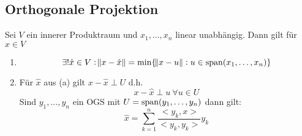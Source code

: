 \subsection{Orthogonale Projektion}
Sei $V$ ein innerer Produktraum und $x_1, \ldots, x_n$ linear unabhängig. Dann gilt
für $x \in V$
\begin{enumerate}[label= (\alph*)]
	\item
		\begin{equation*}
			\exists! \hat{x} \in V: \norm{x - \hat{x}} = 
			\min \{\norm{x-u}: u \in \operatorname{span}(x_1, \ldots, x_n) \}
		\end{equation*}
	\item
		Für $\hat{x}$ aus (a) gilt $x-\hat{x} \perp U$ d.h.
		\begin{equation*}
			x - \hat{x} \perp u\ \forall u \in U
		\end{equation*}
		Sind $y_1, \ldots, y_n$ ein OGS mit $U = \operatorname{span}(y_1, \ldots, y_n)$ dann gilt:
		\begin{equation*}
			\hat{x} = \sum_{k=1}^{n} \frac{<y_k,x>}{<y_k, y_k>} y_k
		\end{equation*}
\end{enumerate}
